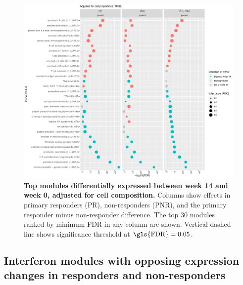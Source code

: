 \begin{figure}
    \centering
    \includegraphics[width=1.0\textwidth,page=1]{mainmatter/figures/chapter_04/plot_gene_set_enrichment.tmodCERNO_panelplot_reversed_C_3R_1R,C_3N_1N,C_(3R_1R)_(3N_1N).cell_prop_correction_TRUE.pdf}
    \caption{
        \textbf{Top modules differentially expressed between week 14 and week 0, adjusted for cell composition.}
        Columns show effects in primary responders (PR), non-responders (PNR), and the primary responder minus non-responder difference. 
        The top 30 modules ranked by minimum \gls{FDR} in any column are shown. 
        Vertical dashed line shows significance threshold at $\text{\gls{FDR}} = 0.05$.
    }
    \label{fig:multipants_dge_panelPlot_week_14_0_R_N_cellPropT}
\end{figure}

\subsection{Interferon modules with opposing expression changes in responders and non-responders}
\label{subsec:multipants_dge_opposing_interferon}

